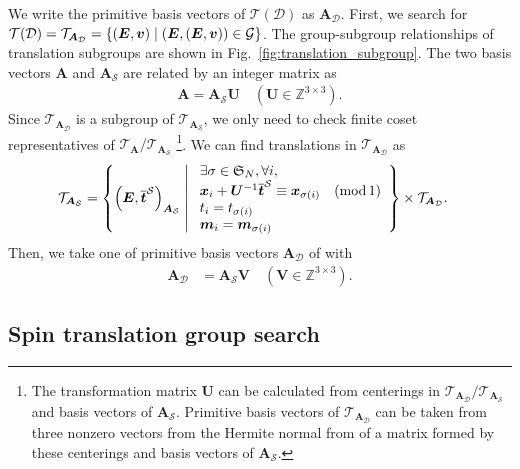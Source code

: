 We write the primitive basis vectors of $\mathcal{T}(\mathcal{D})$ as $\bm{A}_{\mathcal{D}}$.
First, we search for $\mathcal{T}(\mathcal{D}) = \mathcal{T}_{\bm{A}_{\mathcal{D}}} = \left\{  (\bm{E}, \bm{v})  \mathrel{}\middle|\mathrel{}  (\bm{E}, (\bm{E}, \bm{v})) \in \mathcal{G}  \right\}$.
The group-subgroup relationships of translation subgroups are shown in Fig.~\ref{fig:translation_subgroup}.
The two basis vectors $\bm{A}$ and $\bm{A}_{\mathcal{S}}$ are related by an integer matrix as
\begin{align}
  \bm{A} = \bm{A}_{\mathcal{S}} \bm{U} \quad (\bm{U} \in \mathbb{Z}^{3 \times 3}).
\end{align}
Since $\mathcal{T}_{\bm{A}_{\mathcal{D}}}$ is a subgroup of $\mathcal{T}_{\bm{A}_{\mathcal{S}}}$, we only need to check finite coset representatives of $\mathcal{T}_{\bm{A}} / \mathcal{T}_{\bm{A}_{\mathcal{S}}}$ \footnote{
  The transformation matrix $\bm{U}$ can be calculated from centerings in $\mathcal{T}_{\bm{A}_{\mathcal{D}}} / \mathcal{T}_{\bm{A}_{\mathcal{S}}}$ and basis vectors of $\bm{A}_{\mathcal{S}}$.
  Primitive basis vectors of $\mathcal{T}_{\bm{A}_{\mathcal{D}}}$ can be taken from three nonzero vectors from the Hermite normal from of a matrix formed by these centerings and basis vectors of $\bm{A}_{\mathcal{S}}$.
}.
We can find translations in $\mathcal{T}_{\bm{A}_{\mathcal{D}}}$ as
\begin{align}
  \mathcal{T}_{\bm{A}_{\mathcal{S}}}
    &= \left\{ 
      \left( \bm{E}, \overline{ \bm{t} }^{\mathcal{S}} \right)_{ \bm{A}_{\mathcal{S}} }
       \mathrel{}\middle|\mathrel{} 
        \begin{array}{l}
          \exists \sigma \in \mathfrak{S}_{N}, \forall i, \\
          \bm{x}_{i} + \bm{U}^{-1} \overline{ \bm{t} }^{\mathcal{S}} \equiv \bm{x}_{\sigma(i)} \quad (\mathrm{mod}\, 1) \\
          t_{i} = t_{\sigma(i)} \\
          \bm{m}_{i} = \bm{m}_{\sigma(i)}
        \end{array}
       \right\}
      \times \mathcal{T}_{\bm{A}_{\mathcal{D}}}.
\end{align}
Then, we take one of primitive basis vectors $\bm{A}_{\mathcal{D}}$ of with
\begin{align}
  \bm{A}_{\mathcal{D}}
    &= \bm{A}_{\mathcal{S}} \bm{V} \quad (\bm{V} \in \mathbb{Z}^{3 \times 3}).
\end{align}

\subsection{Spin translation group search}

